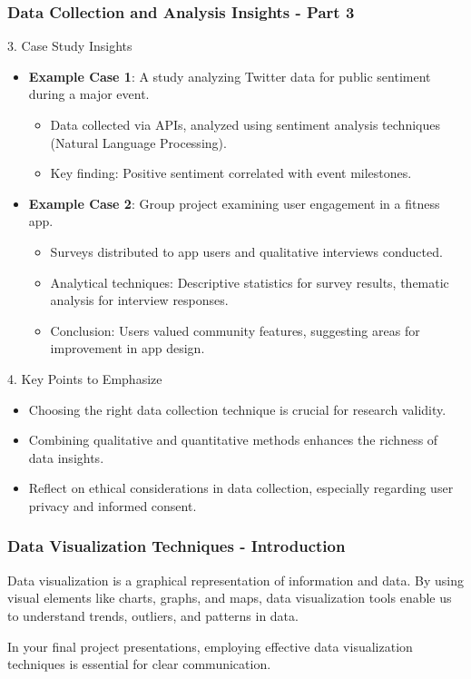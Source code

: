 \documentclass{beamer}
\begin{document}
\begin{frame}[fragile]
    \frametitle{Data Collection and Analysis Insights - Part 3}
    \begin{block}{3. Case Study Insights}
        \begin{itemize}
            \item \textbf{Example Case 1}: A study analyzing Twitter data for public sentiment during a major event.
            \begin{itemize}
                \item Data collected via APIs, analyzed using sentiment analysis techniques (Natural Language Processing).
                \item Key finding: Positive sentiment correlated with event milestones.
            \end{itemize}
            \item \textbf{Example Case 2}: Group project examining user engagement in a fitness app.
            \begin{itemize}
                \item Surveys distributed to app users and qualitative interviews conducted.
                \item Analytical techniques: Descriptive statistics for survey results, thematic analysis for interview responses.
                \item Conclusion: Users valued community features, suggesting areas for improvement in app design.
            \end{itemize}
        \end{itemize}
    \end{block}
    
    \begin{block}{4. Key Points to Emphasize}
        \begin{itemize}
            \item Choosing the right data collection technique is crucial for research validity.
            \item Combining qualitative and quantitative methods enhances the richness of data insights.
            \item Reflect on ethical considerations in data collection, especially regarding user privacy and informed consent.
        \end{itemize}
    \end{block}
\end{frame}

\begin{frame}[fragile]
    \frametitle{Data Visualization Techniques - Introduction}
    Data visualization is a graphical representation of information and data. By using visual elements like charts, graphs, and maps, data visualization tools enable us to understand trends, outliers, and patterns in data. 

    In your final project presentations, employing effective data visualization techniques is essential for clear communication.
\end{frame}
\end{document}
